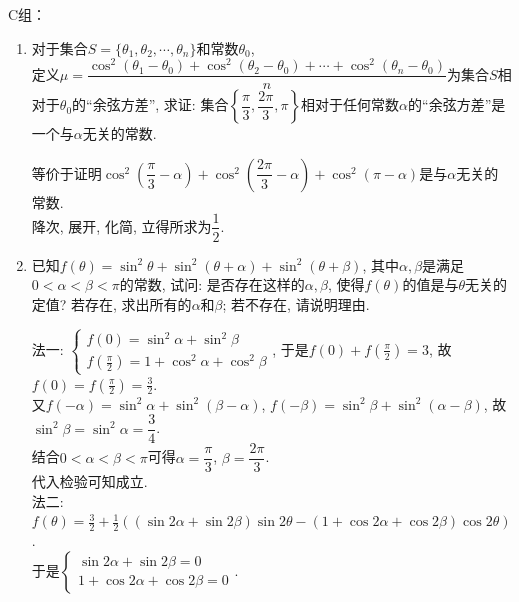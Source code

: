 C组：
\begin{enumerate}
    \item 对于集合$S=\{\theta_1,\theta_2,\cdots,\theta_n\}$和常数$\theta_0$, \\
    定义$\mu=\dfrac{\cos^2(\theta_1-\theta_0)+\cos^2(\theta_2-\theta_0)+\cdots+\cos^2(\theta_n-\theta_0)}{n}$为集合$S$相对于$\theta_0$的``余弦方差'', 
    求证: 集合$\left\{\dfrac{\pi}{3},\dfrac{2\pi}{3},\pi\right\}$相对于任何常数$\alpha$的``余弦方差''是一个与$\alpha$无关的常数. 
    \begin{jieda}
    等价于证明$\cos^2\left(\dfrac{\pi}{3}-\alpha\right)+\cos^2\left(\dfrac{2\pi}{3}-\alpha\right)+\cos^2(\pi-\alpha)$是与$\alpha$无关的常数. \\
    降次, 展开, 化简, 立得所求为$\dfrac{1}{2}$. 
    \end{jieda}
    
    
    \item 已知$f(\theta)=\sin^2\theta+\sin^2(\theta+\alpha)+\sin^2(\theta+\beta)$, 
    其中$\alpha,\beta$是满足$0<\alpha<\beta<\pi$的常数, 试问: 是否存在这样的$\alpha,\beta$, 使得$f(\theta)$的值是与$\theta$无关的定值? 
    若存在, 求出所有的$\alpha$和$\beta$; 若不存在, 请说明理由. 
    \begin{jieda}
    法一: 
    $\begin{cases}
    f(0)=\sin^2\alpha+\sin^2\beta\\
    f(\frac{\pi}{2})=1+\cos^2\alpha+\cos^2\beta
    \end{cases}$, 于是$f(0)+f(\frac{\pi}{2})=3$, 故$f(0)=f(\frac{\pi}{2})=\frac{3}{2}$. \\
    又$f(-\alpha)=\sin^2\alpha+\sin^2(\beta-\alpha)$, $f(-\beta)=\sin^2\beta+\sin^2(\alpha-\beta)$, 
    故$\sin^2\beta=\sin^2\alpha=\dfrac{3}{4}$. \\
    结合$0<\alpha<\beta<\pi$可得$\alpha=\dfrac{\pi}{3}$, $\beta=\dfrac{2\pi}{3}$. \\
    代入检验可知成立. \\
    法二: $f(\theta)=\frac{3}{2}+\frac{1}{2}((\sin2\alpha+\sin2\beta)\sin2\theta-(1+\cos2\alpha+\cos2\beta)\cos2\theta)$. \\
    于是$\begin{cases}
    \sin2\alpha+\sin2\beta=0\\
    1+\cos2\alpha+\cos2\beta=0
    \end{cases}$. 
    \end{jieda}
\end{enumerate}

